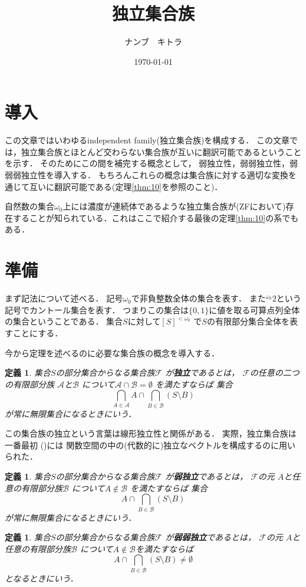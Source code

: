 \documentclass[leqno, a4paper, 12pt]{jsarticle}
\title{独立集合族}
\author{ナンブ　キトラ}
\date{\today}
\newtheorem{df}[thm]{定義}
\newcommand{\myomega}{\omega_{0}}
\begin{document}
\maketitle

\section{導入}
この文章ではいわゆるindependent family(独立集合族)を構成する．
この文章では，独立集合族とほとんど交わらない集合族が互いに翻訳可能であるということを示す．
そのためにこの間を補完する概念として，
弱独立性，弱弱独立性，弱弱弱独立性を導入する．
もちろんこれらの概念は集合族に対する適切な変換を通じて互いに翻訳可能である(定理\ref{thm:10}を参照のこと)．

自然数の集合$\myomega$上には濃度が連続体であるような独立集合族が(ZFにおいて)存在することが知られている．これはここで紹介する最後の定理\ref{thm:10}の系でもある．


\section{準備}
まず記法について述べる．
記号$\myomega$で非負整数全体の集合を表す．
また${}^{\myomega}2$という記号でカントール集合を表す．
つまりこの集合は$\{0, 1\}$に値を取る可算点列全体の集合ということである．
集合$S$に対して$[S]^{<\myomega}$
で$S$の有限部分集合全体を表すことにする．

今から定理を述べるのに必要な集合族の概念を導入する．
\begin{df}
集合$S$の部分集合からなる集合族$\mathcal{F}$
が\textbf{独立}であるとは，
$\mathcal{F}$の任意の二つの有限部分族
$\mathcal{A}$と$\mathcal{B}$
について$\mathcal{A}\cap \mathcal{B}=\emptyset$
を満たすならば
集合
\[
\bigcap_{A\in \mathcal{A}}A\cap \bigcap_{B\in \mathcal{B}}(S\setminus B)
\]
が常に無限集合になるときにいう．
\end{df}
この集合族の独立という言葉は線形独立性と関係がある．
実際，独立集合族は一番最初
(\cite[p.~80]{FK})には
関数空間の中の(代数的に)独立なベクトルを構成するのに用いられた．

\begin{df}
集合$S$の部分集合からなる集合族$\mathcal{F}$
が\textbf{弱独立}であるとは，
$\mathcal{F}$の元
$A$と任意の有限部分族$\mathcal{B}$
について$A\not \in \mathcal{B}$
を満たすならば
集合
\[
A\cap \bigcap_{B\in \mathcal{B}}(S\setminus B)
\]
が常に無限集合になるときにいう．
\end{df}


\begin{df}
集合$S$の部分集合からなる集合族$\mathcal{F}$
が\textbf{弱弱独立}であるとは，
$\mathcal{F}$の元
$A$と任意の有限部分族$\mathcal{B}$
について$A\not\in \mathcal{B}$を満たすならば
\[
A\cap \bigcap_{B\in \mathcal{B}}(S\setminus B)\neq \emptyset
\]
となるときにいう．
\end{df}
\end{document}
